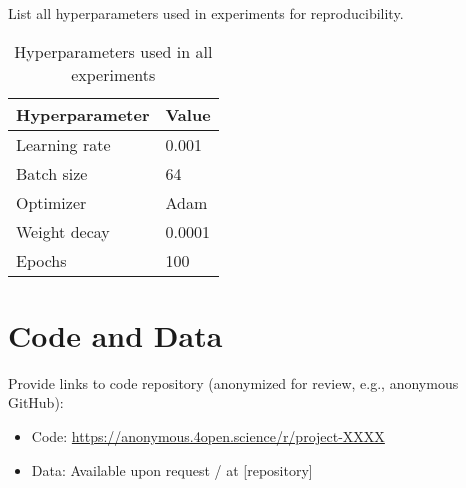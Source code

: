 \documentclass{article}
\begin{document}
List all hyperparameters used in experiments for reproducibility.

\begin{table}[h]
\centering
\caption{Hyperparameters used in all experiments}
\begin{tabular}{ll}
\toprule
Hyperparameter & Value \\
\midrule
Learning rate & 0.001 \\
Batch size & 64 \\
Optimizer & Adam \\
Weight decay & 0.0001 \\
Epochs & 100 \\
\bottomrule
\end{tabular}
\end{table}

\section{Code and Data}
\label{app:code}

Provide links to code repository (anonymized for review, e.g., anonymous GitHub):
\begin{itemize}
    \item Code: \url{https://anonymous.4open.science/r/project-XXXX}
    \item Data: Available upon request / at [repository]
\end{itemize}
\end{document}
